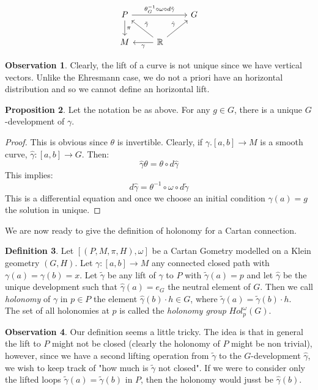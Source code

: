 \documentclass[12pt,a4paper]{report}
\theoremstyle{definition}
\newtheorem{Def}{Definition}[chapter]
\theoremstyle{Theorem}
\newtheorem{Prop}[Def]{Proposition}
\theoremstyle{definition}
\theoremstyle{definition}
\newtheorem{Obs}[Def]{Observation}
\begin{document}
	$$
	\begin{tikzcd}
		P\arrow{d}{\pi} \arrow{rr}{\theta^{-1}_G\circ \omega\circ d\tilde{\gamma}}& & G\\
		M & \mathbb{R}\arrow{l}{\gamma} \arrow{ul}[swap]{\tilde{\gamma}}\arrow{ur}{\hat{\gamma}}
	\end{tikzcd}
	$$
	\begin{Obs}
		Clearly, the lift of a curve is not unique since we have vertical vectors. Unlike the Ehresmann case, we do not a priori have an horizontal distribution and so we cannot define an horizontal lift.
	\end{Obs}
	\begin{Prop}
		Let the notation be as above.
		For any $g\in G$, there is a unique $G$-development of $\gamma$.
	\end{Prop}
	\begin{proof}
		This is obvious since $\theta$ is invertible. Clearly, if $\gamma.[a,b]\rightarrow M$ is a smooth curve, $\hat{\gamma}:[a,b]\rightarrow G$. Then:
		$$\hat{\gamma}\theta=\theta\circ d\hat{\gamma}$$
		This implies:
		$$d\hat{\gamma}=\theta^{-1}\circ \omega\circ d\tilde{\gamma}$$
		This is a differential equation and once we choose an initial condition $\hat{\gamma}(a)=g$ the solution in unique.
	\end{proof}
	We are now ready to give the definition of holonomy for a Cartan connection.
	\begin{Def}
		Let $[(P,M,\pi,H),\omega]$ be a Cartan Gometry modelled on a Klein geometry $(G,H)$. Let $\gamma:[a,b]\rightarrow M$ any connected closed path with $\gamma(a)=\gamma(b)=x$. Let $\tilde{\gamma}$ be any lift of $\gamma$ to $P$ with $\tilde{\gamma}(a)=p$ and let $\hat{\gamma}$ be the unique development such that $\hat{\gamma}(a)=e_G$ the neutral element of $G$. Then we call \textit{holonomy} of $\gamma$ in $p\in P$ the element $\hat{\gamma}(b)\cdot h\in G$, where $\tilde{\gamma}(a)=\tilde{\gamma}(b)\cdot h$.
		\\ The set of all holonomies at $p$ is called the \textit{holonomy group} $Hol_p^\omega(G)$.
	\end{Def}
	\begin{Obs}
		Our definition seems a little tricky. The idea is that in general the lift to $P$ might not be closed (clearly the holonomy of $P$ might be non trivial), however, since we have a second lifting operation from $\tilde{\gamma}$ to the $G$-development $\hat{\gamma}$, we wish to keep track of "how much is $\tilde{\gamma}$ not closed". If we were to consider only the lifted loops $\tilde{\gamma}(a)=\tilde{\gamma}(b)$ in $P$, then the holonomy would jusst be $\hat{\gamma}(b)$.
	\end{Obs}
\end{document}
